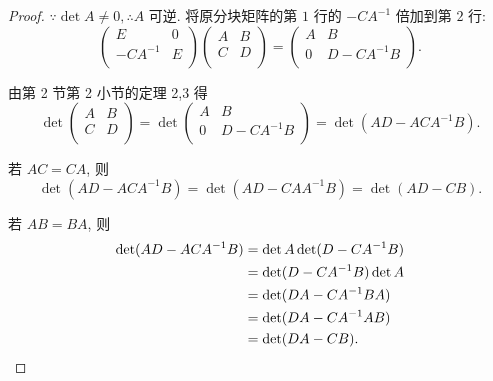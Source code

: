 \documentclass{ctexart}
\begin{document}
\begin{proof}
    $\because\det A\neq0,\therefore A$ 可逆. 将原分块矩阵的第 $1$ 行的 $-CA^{-1}$ 倍加到第 $2$ 行:
    \[\begin{pmatrix}
        E & 0 \\
        -CA^{-1} & E \\
    \end{pmatrix}\begin{pmatrix}
        A & B \\
        C & D \\
    \end{pmatrix}=\begin{pmatrix}
        A & B \\
        0 & D-CA^{-1}B \\
    \end{pmatrix}.\]

    由第 2 节第 2 小节的定理 2,3 得
    \[\det\begin{pmatrix}
        A & B \\
        C & D \\
    \end{pmatrix}=\det\begin{pmatrix}
        A & B \\
        0 & D-CA^{-1}B \\
    \end{pmatrix}=\det(AD-ACA^{-1}B).\]

    若 $AC=CA$, 则
    \[\det(AD-ACA^{-1}B)=\det(AD-CAA^{-1}B)=\det(AD-CB).\]

    若 $AB=BA$, 则
    \begin{align*}
        \det(AD-ACA^{-1}B) & =\det A\det(D-CA^{-1}B) \\
        & =\det(D-CA^{-1}B)\det A \\
        & =\det(DA-CA^{-1}BA) \\
        & =\det(DA-CA^{-1}AB) \\
        & =\det(DA-CB).\qedhere
    \end{align*}
\end{proof}
\end{document}
